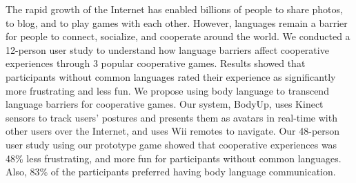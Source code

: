 
The rapid growth of the Internet has enabled billions of people to share photos, to blog, and to play games with each other. However, languages remain a barrier for people to connect, socialize, and cooperate around the world. 
We conducted a 12-person user study to understand how language barriers affect cooperative experiences through 3 popular cooperative games. Results showed that participants without common languages rated their experience as significantly more frustrating and less fun. We propose using body language to transcend language barriers for cooperative games. Our system, BodyUp, uses Kinect sensors to track users' postures and presents them as avatars in real-time with other users over the Internet, and uses Wii remotes to navigate.  Our 48-person user study using our prototype game showed that cooperative experiences was 48\% less frustrating, and more fun for participants without common languages. Also, 83\% of the participants preferred having body language communication. 

%
